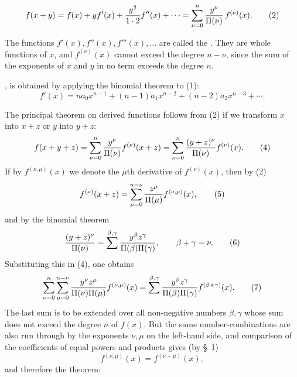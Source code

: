 
\begin{equation}
 f(x+y)=f(x)+yf'(x)+{y^2\over1\cdot2}f''(x)+\cdots
       =\sum_{\nu=0}^{n}{y^\nu\over\Pi(\nu)}\,f^{(\nu)}(x).
\tag{2}
\end{equation}

The functions $f'(x),f''(x),f'''(x),\ldots$ are called the . They are whole functions of $x$, and $f^{(\nu)}(x)$ cannot exceed the degree $n-\nu$, since the sum of the exponents of $x$ and $y$ in no term exceeds the degree $n$.

, is obtained by applying the binomial theorem to (1):
\begin{equation}
 f'(x)=na_0x^{n-1}+(n-1)a_1x^{n-2}+(n-2)a_2x^{n-3}+\cdots .
\tag{3}
\end{equation}

The principal theorem on derived functions follows from (2) if we transform $x$ into $x+z$ or $y$ into $y+z$:
\begin{equation}
 f(x+y+z)=\sum_{\nu=0}^{n}{y^\nu\over\Pi(\nu)}f^{(\nu)}(x+z)
 =\sum_{\nu=0}^{n}{(y+z)^\nu\over\Pi(\nu)}f^{(\nu)}(x).
\tag{4}
\end{equation}
If by $f^{(\nu,\mu)}(x)$ we denote the $\mu$th derivative of $f^{(\nu)}(x)$, then by (2)
\begin{equation}
 f^{(\nu)}(x+z)=\sum_{\mu=0}^{n-\nu}{z^\mu\over\Pi(\mu)}f^{(\nu,\mu)}(x),
\tag{5}
\end{equation}
and by the binomial theorem
\begin{equation}
 { (y+z)^\nu\over\Pi(\nu)}
 =\sum^{\beta,\gamma}{y^\beta z^\gamma\over\Pi(\beta)\Pi(\gamma)},
 \qquad \beta+\gamma=\nu.
\tag{6}
\end{equation}
Substituting this in (4), one obtains
\begin{equation}
 \sum_{\nu=0}^{n}\sum_{\mu=0}^{n-\nu}
 {y^\nu z^\mu\over\Pi(\nu)\Pi(\mu)}f^{(\nu,\mu)}(x)
 =
 \sum^{\beta,\gamma}
 {y^\beta z^\gamma\over\Pi(\beta)\Pi(\gamma)}f^{(\beta+\gamma)}(x).
\tag{7}
\end{equation}
The last sum is to be extended over all non-negative numbers $\beta,\gamma$ whose sum does not exceed the degree $n$ of $f(x)$. But the same number-combinations are also run through by the exponents $\nu,\mu$ on the left-hand side, and comparison of the coefficients of equal powers and products gives (by \S~1)
\begin{equation}
 f^{(\nu,\mu)}(x)=f^{(\nu+\mu)}(x),
\tag{8}
\end{equation}
and therefore the theorem:
